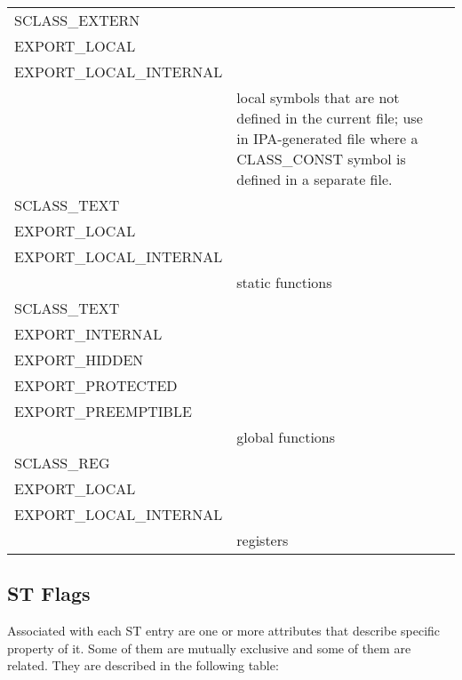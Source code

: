 \begin{table}[h]
{\begin{tabular}{|p{2in}|p{2in}|p{2in}|}
\index{SCLASS\_EXTERN}%
SCLASS\_EXTERN 
&
\begin{minipage}{2in}
\flushleft
~\\
EXPORT\_LOCAL\\
EXPORT\_LOCAL\_INTERNAL\\~ 
\end{minipage}
&
local symbols that are not defined in the current file;
use in IPA-generated file
where a
\index{CLASS\_CONST}%
CLASS\_CONST symbol is defined in a
separate file. \\\hline

\index{SCLASS\_TEXT}%
SCLASS\_TEXT 
&
\begin{minipage}{2in}
\flushleft
~\\
EXPORT\_LOCAL\\
\index{EXPORT\_LOCAL\_INTERNAL}%
EXPORT\_LOCAL\_INTERNAL \\~
\end{minipage}
&
static functions
\\\hline

\index{SCLASS\_TEXT}%
SCLASS\_TEXT 
&
\begin{minipage}{2in}
\flushleft
~\\
EXPORT\_INTERNAL\\
EXPORT\_HIDDEN\\
EXPORT\_PROTECTED\\ 
EXPORT\_PREEMPTIBLE\\~
\end{minipage}
&
global functions 
\\\hline
SCLASS\_REG 
&
\begin{minipage}{2in}
\flushleft
~\\
EXPORT\_LOCAL\\
EXPORT\_LOCAL\_INTERNAL\\~
\end{minipage}
&
registers\\\hline
\end{tabular}
}
\end{table}

\clearpage
\subsection{ST Flags}

Associated with each
%
ST entry are one or more attributes that
describe specific property of it. Some of them are mutually exclusive
and some of them are related. They are described in the following
table:

